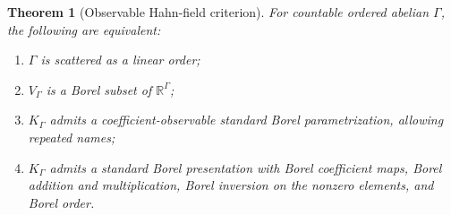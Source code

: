 \documentclass[11pt]{article}
\numberwithin{equation}{section}
\newtheorem{theorem}{Theorem}[section]
\theoremstyle{definition}
\theoremstyle{remark}
\newcommand{\R}{\mathbb R}
\begin{document}
\begin{theorem}[Observable Hahn-field criterion]
\label{pma:bor:thm:field}
For countable ordered abelian $\Gamma$, the following are equivalent:
\begin{enumerate}[label=(\roman*)]
\item $\Gamma$ is scattered as a linear order;
\item $V_\Gamma$ is a Borel subset of $\R^\Gamma$;
\item $K_\Gamma$ admits a coefficient-observable standard Borel
parametrization, allowing repeated names;
\item $K_\Gamma$ admits a standard Borel presentation with Borel coefficient
maps, Borel addition and multiplication, Borel inversion on the nonzero
elements, and Borel order.
\end{enumerate}
\end{theorem}
\end{document}
